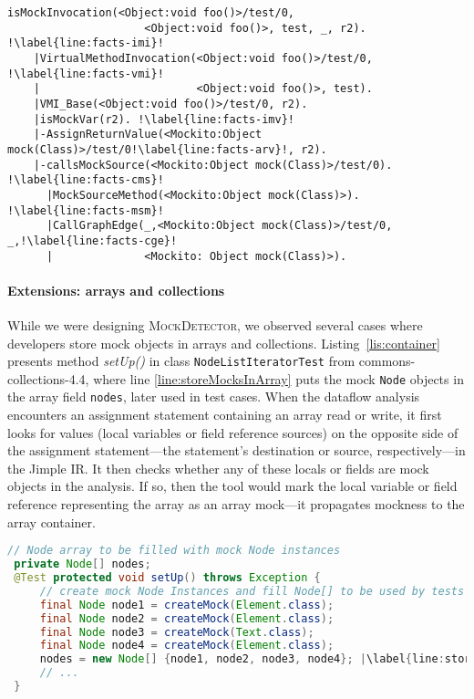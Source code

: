 \begin{lstlisting}[basicstyle=\ttfamily, caption={Facts about invocation \texttt{r2.foo()} in method \texttt{test}.},
basicstyle=\scriptsize\ttfamily, framesep=4.5mm, framexleftmargin=1.0mm, captionpos=b, label=lis:facts, escapechar=!, morekeywords={@Test}]
	isMockInvocation(<Object:void foo()>/test/0, 
	                 <Object:void foo()>, test, _, r2). !\label{line:facts-imi}!
	|VirtualMethodInvocation(<Object:void foo()>/test/0, !\label{line:facts-vmi}!
	|                        <Object:void foo()>, test).
	|VMI_Base(<Object:void foo()>/test/0, r2).
	|isMockVar(r2). !\label{line:facts-imv}!
	|-AssignReturnValue(<Mockito:Object mock(Class)>/test/0!\label{line:facts-arv}!, r2).
	|-callsMockSource(<Mockito:Object mock(Class)>/test/0). !\label{line:facts-cms}!
	  |MockSourceMethod(<Mockito:Object mock(Class)>). !\label{line:facts-msm}!
	  |CallGraphEdge(_,<Mockito:Object mock(Class)>/test/0, _,!\label{line:facts-cge}!
	  |              <Mockito: Object mock(Class)>). 
\end{lstlisting}


\paragraph{Extensions: arrays and collections} While we were designing \textsc{MockDetector}, we observed several cases where developers store mock objects in arrays and collections. Listing~\ref{lis:container} presents method \textit{setUp()} in class \texttt{NodeListIteratorTest} from commons-collections-4.4, where line \ref{line:storeMocksInArray} puts the mock \texttt{Node} objects in the array field \texttt{nodes}, later used in test cases. When the dataflow analysis encounters an assignment statement containing an array read or write, it first looks for values (local variables or field reference sources) on the opposite side of the assignment statement---the statement's destination or source, respectively---in the Jimple IR. It then checks whether any of these locals or fields are mock objects in the analysis. If so, then the tool would mark the local variable or field reference representing the array as an array mock---it propagates mockness to the array container.

\begin{lstlisting}[basicstyle=\ttfamily, caption={This example illustrates a field array container holding mock \\ objects from \textit{setUp()} in \texttt{NodeListIteratorTest}.},
basicstyle=\scriptsize\ttfamily,language = Java, framesep=4.5mm, framexleftmargin=1.0mm, captionpos=b, label=lis:container, escapechar=|, morekeywords={@Test}]
 // Node array to be filled with mock Node instances
 private Node[] nodes;
 @Test protected void setUp() throws Exception {
     // create mock Node Instances and fill Node[] to be used by tests
     final Node node1 = createMock(Element.class);
     final Node node2 = createMock(Element.class);
     final Node node3 = createMock(Text.class);
     final Node node4 = createMock(Element.class);
     nodes = new Node[] {node1, node2, node3, node4}; |\label{line:storeMocksInArray}|
     // ...
 }
\end{lstlisting}


